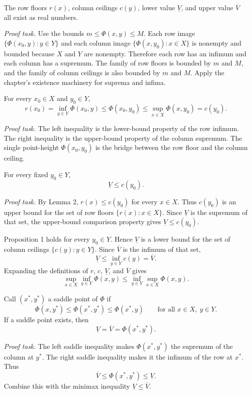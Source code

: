 \begin{remark*}[Interpretation]
The row floors \(r(x)\), column ceilings \(c(y)\), lower value
\(\underline V\), and upper value \(\overline V\) all exist as real numbers.

\emph{Proof task.}
Use the bounds \(m\le\Phi(x,y)\le M\). Each row image
\(\{\Phi(x_0,y):y\in Y\}\) and each column image
\(\{\Phi(x,y_0):x\in X\}\) is nonempty and bounded because \(X\) and \(Y\)
are nonempty. Therefore each row has an infimum and each column has a
supremum. The family of row floors is bounded by \(m\) and \(M\), and the
family of column ceilings is also bounded by \(m\) and \(M\). Apply the
chapter's existence machinery for suprema and infima.
\end{remark*}

\begin{remark*}[Interpretation]
For every \(x_0\in X\) and \(y_0\in Y\),
\[
  r(x_0)
  =
  \inf_{y\in Y}\Phi(x_0,y)
  \le
  \Phi(x_0,y_0)
  \le
  \sup_{x\in X}\Phi(x,y_0)
  =
  c(y_0).
\]

\emph{Proof task.}
The left inequality is the lower-bound property of the row infimum. The
right inequality is the upper-bound property of the column supremum. The
single point-height \(\Phi(x_0,y_0)\) is the bridge between the row floor
and the column ceiling.
\end{remark*}

\begin{remark*}[Interpretation]
For every fixed \(y_0\in Y\),
\[
  \underline V \le c(y_0).
\]

\emph{Proof task.}
By Lemma 2, \(r(x)\le c(y_0)\) for every \(x\in X\). Thus \(c(y_0)\) is an
upper bound for the set of row floors \(\{r(x):x\in X\}\). Since
\(\underline V\) is the supremum of that set, the upper-bound comparison
property gives \(\underline V\le c(y_0)\).
\end{remark*}

\begin{remark*}[Interpretation]
Proposition 1 holds for every \(y_0\in Y\). Hence \(\underline V\) is a
lower bound for the set of column ceilings \(\{c(y):y\in Y\}\). Since
\(\overline V\) is the infimum of that set,
\[
  \underline V
  \le
  \inf_{y\in Y}c(y)
  =
  \overline V.
\]
Expanding the definitions of \(r\), \(c\), \(\underline V\), and
\(\overline V\) gives
\[
  \sup_{x \in X}\inf_{y \in Y}\Phi(x,y)
  \le
  \inf_{y \in Y}\sup_{x \in X}\Phi(x,y).
\]
\end{remark*}

\begin{remark*}[Interpretation]
Call \((x^\ast,y^\ast)\) a saddle point of \(\Phi\) if
\[
  \Phi(x,y^\ast)
  \le
  \Phi(x^\ast,y^\ast)
  \le
  \Phi(x^\ast,y)
  \qquad
  \text{for all } x\in X,\ y\in Y.
\]
If a saddle point exists, then
\[
  \underline V=\overline V=\Phi(x^\ast,y^\ast).
\]

\emph{Proof task.}
The left saddle inequality makes \(\Phi(x^\ast,y^\ast)\) the supremum of
the column at \(y^\ast\). The right saddle inequality makes it the
infimum of the row at \(x^\ast\). Thus
\[
  \overline V \le \Phi(x^\ast,y^\ast) \le \underline V.
\]
Combine this with the minimax inequality
\(\underline V\le\overline V\).
\end{remark*}

